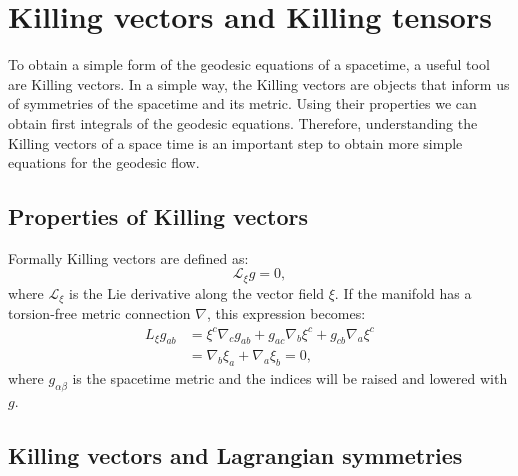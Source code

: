 \chapter{Killing vectors and Killing tensors}\label{Killingchapter}
To obtain a simple form of the geodesic equations of a spacetime, a useful tool are Killing vectors. In a simple way, the Killing vectors are objects that inform us of symmetries of the spacetime and its metric. Using their properties we can obtain first integrals of the geodesic equations. Therefore, understanding the Killing vectors of a space time is an important step to obtain more simple equations for the geodesic flow.

\section{Properties of Killing vectors}

Formally Killing vectors are defined as:
\begin{equation}
\mathcal{L}_\xi g = 0,
\end{equation}
where $\mathcal{L}_\xi$ is the Lie derivative along the vector field $\xi$. If the manifold has a torsion-free metric connection $\nabla$, this expression becomes:
\begin{align}\label{killingformula}
{L}_\xi g_{a b} &= \xi^c \nabla_c g_{a b} + g_{a c} \nabla_b \xi^c + g_{c b} \nabla_a \xi^c \\ \nonumber
&= \nabla_b \xi_a +  \nabla_a \xi_b = 0 ,
\end{align}
where $g_{\alpha \beta}$ is the spacetime metric and the indices will be raised and lowered with $g$.

\section{Killing vectors and Lagrangian symmetries}

